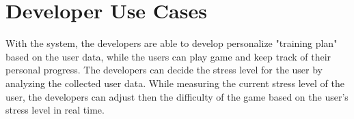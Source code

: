 \begin{table}[h!]
\centering
\caption{Track Personal Progress Use Case}
\label{table:game-with-child}
\vspace{5mm}
\end{table}

\clearpage

\section{Developer Use Cases}

With the system, the developers are able to develop personalize "training plan" based on the user data, while the users can play game and keep track of their personal progress. The developers can decide the stress level for the user by analyzing the collected user data. While measuring the current stress level of the user, the developers can adjust then the difficulty of the game based on the user's stress level in real time.


\begin{table}[h!]
\centering
\caption{Collect User Data Use Case}
\label{table:game-with-child}
\vspace{5mm}
\end{table}

